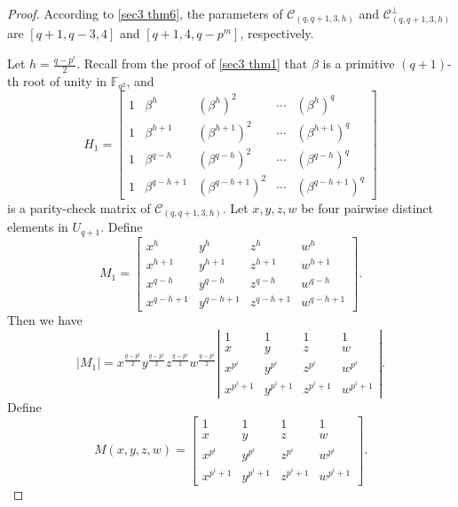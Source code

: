 \documentclass[sn-mathphys-num]{sn-jnl}%
\theoremstyle{thmstyleone}%
\theoremstyle{thmstyletwo}%
\theoremstyle{thmstylethree}%
\begin{document}
\begin{proof}
	According to \cref{sec3 thm6}, the parameters of $\mathcal{C}_{(q,q+1,3,h)}$ and $\mathcal{C}^\perp_{(q,q+1,3,h)}$ are $[q+1,q-3,4]$ and $[q+1,4,q-p^m]$, respectively. 
	
	Let $h=\frac{q-p^i}{2}$. Recall from the proof of \cref{sec3 thm1} that $\beta$ is a primitive $(q+1)$-th root of unity in $\mathbb{F}_{q^2}$, and 
	\begin{equation*}
		\left.H_1=\left[\begin{array}{lllll}1&\beta^{h}&(\beta^{h})^2&\cdots&(\beta^{h})^q\\1&\beta^{h+1}&(\beta^{h+1})^2&\cdots&(\beta^{h+1})^q\\1&\beta^{q-h}&(\beta^{q-h})^2&\cdots&(\beta^{q-h})^q\\1&\beta^{q-h+1}&(\beta^{q-h+1})^2&\cdots&(\beta^{q-h+1})^q\end{array}\right.\right]
	\end{equation*}
	is a parity-check matrix of $\mathcal{C}_{(q,q+1,3,h)}$. Let $x,y,z,w$ be four pairwise distinct elements in $U_{q+1}$. Define
	\begin{equation*}
		M_1=\left[\begin{array}{llll}x^{h}&y^{h}&z^{h}&w^{h}\\x^{h+1}&y^{h+1}&z^{h+1}&w^{h+1}\\x^{q-h}&y^{q-h}&z^{q-h}&w^{q-h}\\x^{q-h+1}&y^{q-h+1}&z^{q-h+1}&w^{q-h+1}\end{array}\right].
	\end{equation*}
	Then we have
	\begin{equation*}
		|M_1|=x^{\frac{q-p^i}{2}}y^{\frac{q-p^i}{2}}z^{\frac{q-p^i}{2}}w^{\frac{q-p^i}{2}}\left|\begin{array}{llll}1&1&1&1\\x&y&z&w\\x^{p^i}&y^{p^i}&z^{p^i}&w^{p^i}\\x^{p^i+1}&y^{p^i+1}&z^{p^i+1}&w^{p^i+1}\end{array}\right|.
	\end{equation*}
	Define
	\begin{equation}\label{sec4 thm1 equ1}
		M(x,y,z,w)=\left[\begin{array}{llll}1&1&1&1\\x&y&z&w\\x^{p^i}&y^{p^i}&z^{p^i}&w^{p^i}\\x^{p^i+1}&y^{p^i+1}&z^{p^i+1}&w^{p^i+1}\end{array}\right].

\end{equation}
\end{proof}
\end{document}
